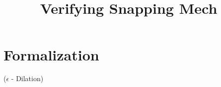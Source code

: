 \documentclass{article}
\begin{document}
\title{Verifying Snapping Mech}

\maketitle

\section{Formalization}
\begin{def}
($\epsilon$ - Dilation)
\end{def}
\end{document}
